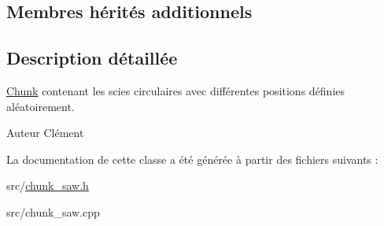 \subsection*{Membres hérités additionnels}


\subsection{Description détaillée}
\hyperlink{class_chunk}{Chunk} contenant les scies circulaires avec différentes positions définies aléatoirement. 

\begin{DoxyAuthor}{Auteur}
Clément 
\end{DoxyAuthor}


La documentation de cette classe a été générée à partir des fichiers suivants \+:\begin{DoxyCompactItemize}
\item 
src/\hyperlink{chunk__saw_8h}{chunk\+\_\+saw.\+h}\item 
src/chunk\+\_\+saw.\+cpp\end{DoxyCompactItemize}
